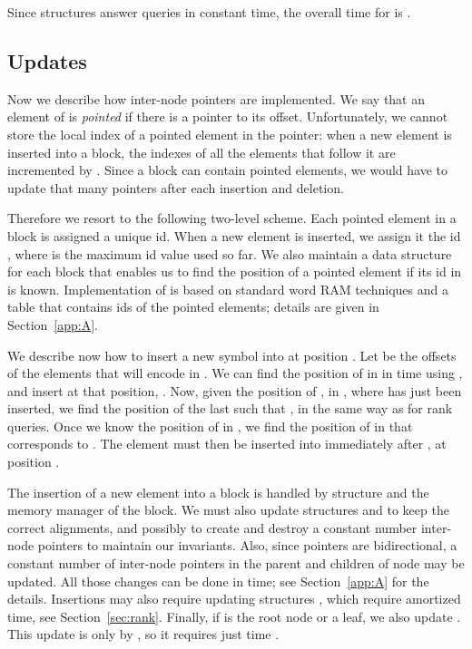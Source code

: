 \documentclass[11pt]{article}
\begin{document}
Since structures  answer queries in constant time, the overall time for
 is .


\subsection{Updates} \label{sec:H}

Now we describe how inter-node pointers are implemented.
We say that an element of  is \emph{pointed} if there 
is a pointer to its offset. 
Unfortunately, we cannot store the local index of a pointed 
element in the pointer: when a new element is inserted into 
a block, the indexes of all the elements that follow it are incremented 
by . Since a block can contain  pointed 
elements, we would have to update that many
pointers after each insertion and deletion. 

Therefore we resort to the following two-level scheme. 
Each pointed element in a block is assigned a unique id. 
When a new element is inserted, we assign it the id 
, where  is the maximum 
id value used so far. 
We also maintain a data structure  for each block 
 that enables us to find the position 
of a pointed element if its id in  is known.
Implementation of  is based on standard 
word RAM techniques and a table that contains ids of the 
pointed elements; details are given in Section~\ref{app:A}.


We describe now how to insert a new symbol  into  at position . 
Let  be the offsets of the elements that will encode 
 in . 
We can find the position of  in  in  time
using , and insert  at that position, .
Now, given the position of , in , where  has
just been inserted,
we find the position of the last  such that 
, in the same way as  for rank queries.
Once we know the position of  in , we find 
the position of  in  that corresponds to . 
The element  must then be inserted into  
immediately after , at position .

The insertion of a new element  into a block  
is handled by structure  and the memory manager of the block.
We must also update structures
 and  to keep the correct alignments, and possibly
to create and destroy a constant number inter-node pointers to maintain 
our invariants.
Also, since pointers are bidirectional, a constant number of inter-node 
pointers in the parent and children of node  may be updated. All those 
changes can be done in  time; see Section~\ref{app:A} for the details. 
Insertions may also require updating structures , which require
 amortized time, see Section~\ref{sec:rank}. 
Finally, if  is the root node or a leaf, we also update .
This update is only by , so it requires just
 time \cite[Lem.~1]{NS10}.
\end{document}
